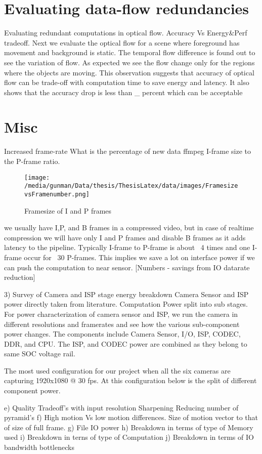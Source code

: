 \section{Evaluating data-flow redundancies}
Evaluating redundant computations in optical flow. 
Accuracy Vs Energy\&Perf tradeoff. 
Next we evaluate the optical flow for a scene where foreground has movement and background is static. The temporal flow difference is found out to see the variation of flow. As expected we see the flow change only for the regions where the objects are moving. This observation suggests that accuracy of optical flow can be trade-off with computation time to save energy and latency. It also shows that the accuracy drop is less than \_ percent which can be acceptable


\section{Misc}

	
Increased frame-rate\newline
What is the percentage of new data
ffmpeg I-frame size to the P-frame ratio.
\begin{figure*}
	\begin{center}
		\texttt{[image: /media/gunman/Data/thesis/ThesisLatex/data/images/FramesizevsFramenumber.png]}
		\caption{Framesize of I and P frames}
		\label{fig:ex_4_9}
	\end{center}
	\vspace{-0.3in}
\end{figure*} 
we usually have I,P, and B frames in a compressed video, but in case of realtime compression we will have only I and P frames and disable B frames as it adds latency to the pipeline. Typically I-frame to P-frame is about ~4 times and one I-frame occur for ~30 P-frames. This implies we save a lot on interface power if we can push the computation to near sensor.  
[Numbers - savings from IO datarate reduction]

3) Survey of Camera and ISP stage energy breakdown
Camera Sensor and ISP power directly taken from literature.
Computation Power split into sub stages. \newline
For power characterization of camera sensor and ISP, we run the camera in different resolutions and framerates and see how the various sub-component power changes. The components include Camera Sensor, I/O, ISP, CODEC, DDR, and CPU. The ISP, and CODEC power are combined as they belong to same SOC voltage rail.

The most used configuration for our project when all the six cameras are capturing 1920x1080 @ 30 fps. At this configuration below is the split of different component power. \newline


	e) Quality Tradeoff's with input resolution\newline
Sharpening
Reducing number of pyramid's
f) High motion Vs low motion differences. Size of motion vector to that of size of full frame. 
g) File IO power
h) Breakdown in terms of type of Memory	used
i) Breakdown in terns of type of Computation
j) Breakdown in terms of IO bandwidth bottlenecks